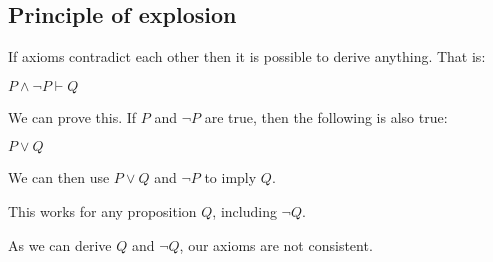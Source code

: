 \subsection{Principle of explosion}

If axioms contradict each other then it is possible to derive anything. That is:

$P\land \neg P\vdash Q$

We can prove this. If \(P\) and \(\neg P\) are true, then the following is also true:

\(P\lor Q\)

We can then use \(P\lor Q\) and \(\neg P\) to imply \(Q\).

This works for any proposition \(Q\), including \(\neg Q\).

As we can derive \(Q\) and \(\neg Q\), our axioms are not consistent.

